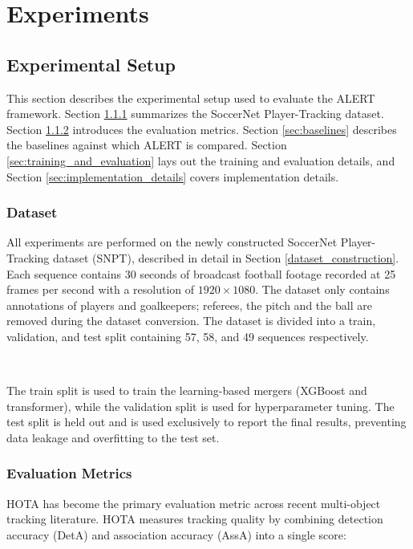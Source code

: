 \chapter{Experiments}\label{chapter:experiments}

\section{Experimental Setup}

This section describes the experimental setup used to evaluate the ALERT framework. Section \ref{sec:dataset} summarizes the SoccerNet Player-Tracking dataset. Section \ref{sec:evaluation_metrics} introduces the evaluation metrics. Section \ref{sec:baselines} describes the baselines against which ALERT is compared. Section \ref{sec:training_and_evaluation} lays out the training and evaluation details, and Section \ref{sec:implementation_details} covers implementation details.


\subsection{Dataset}\label{sec:dataset}
All experiments are performed on the newly constructed SoccerNet Player-Tracking dataset (SNPT), described in detail in Section \ref{dataset_construction}. Each sequence contains 30 seconds of broadcast football footage recorded at 25 frames per second with a resolution of $1920 \times 1080$. The dataset only contains annotations of players and goalkeepers; referees, the pitch and the ball are removed during the dataset conversion. The dataset is divided into a train, validation, and test split containing 57, 58, and 49 sequences respectively.

\

The train split is used to train the learning-based mergers (XGBoost and transformer), while the validation split is used for hyperparameter tuning. The test split is held out and is used exclusively to report the final results, preventing data leakage and overfitting to the test set.

\subsection{Evaluation Metrics}\label{sec:evaluation_metrics}
HOTA \cite{hota} has become the primary evaluation metric across recent multi-object tracking literature. HOTA measures tracking quality by combining detection accuracy (DetA) and association accuracy (AssA) into a single score:

